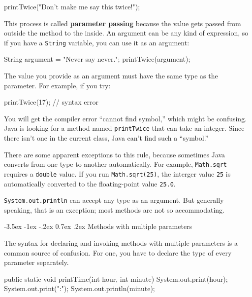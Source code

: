\documentclass[12pt]{book}
\makeatletter
\theoremstyle{exercise}
\newcommand{\java}[1]{\verb"#1"}
\renewcommand{\section}{\@startsection{section}{1}{\z@}%
    {-3.5ex \@plus -1ex \@minus -.2ex}%
    {0.7ex \@plus.2ex}%
    {\normalfont\Large\bfseries}}
\newcommand{\java}[1]{\lstinline{#1}} %
\makeatother
\begin{document}
\begin{code}
    printTwice("Don't make me say this twice!");
\end{code}


This process is called {\bf parameter passing} because the value gets passed from outside the method to the inside.
An argument can be any kind of expression, so if you have a \java{String} variable, you can use it as an argument:

\begin{code}
    String argument = "Never say never.";
    printTwice(argument);
\end{code}

The value you provide as an argument must have the same type as the parameter.
For example, if you try:

\begin{code}
    printTwice(17);  // syntax error
\end{code}

You will get the compiler error ``cannot find symbol,'' which might be confusing.
Java is looking for a method named \java{printTwice} that can take an integer.
Since there isn't one in the current class, Java can't find such a ``symbol.''

There are some apparent exceptions to this rule, because sometimes Java converts from one type to another automatically.
For example, \java{Math.sqrt} requires a \java{double} value.
If you run \java{Math.sqrt(25)}, the interger value \java{25} is automatically converted to the floating-point value \java{25.0}.

\java{System.out.println} can accept any type as an argument.
But generally speaking, that is an exception; most methods are not so accommodating.


\section{Methods with multiple parameters}
\label{time}


The syntax for declaring and invoking methods with multiple parameters is a common source of confusion.
For one, you have to declare the type of every parameter separately.

\begin{code}
    public static void printTime(int hour, int minute) {
        System.out.print(hour);
        System.out.print(":");
        System.out.println(minute);
    }
\end{code}
\end{document}
